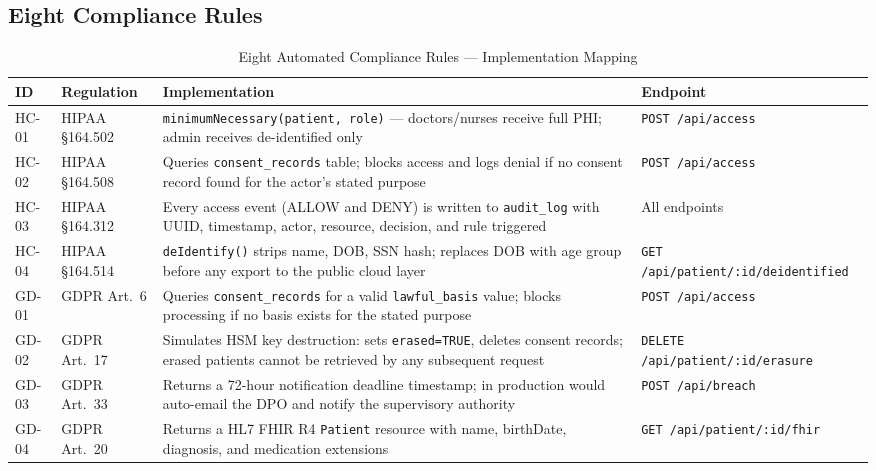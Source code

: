 \documentclass[12pt,a4paper]{article}
\begin{document}
\subsection{Eight Compliance Rules}

\begin{table}[H]
\centering
\caption{Eight Automated Compliance Rules --- Implementation Mapping}
\begin{tabularx}{\textwidth}{@{}llXl@{}}
\toprule
\textbf{ID} & \textbf{Regulation} & \textbf{Implementation} & \textbf{Endpoint} \\
\midrule
HC-01 & HIPAA \S164.502 & \texttt{minimumNecessary(patient, role)} --- doctors/nurses receive full PHI; admin receives de-identified only & \texttt{POST /api/access} \\
\midrule
HC-02 & HIPAA \S164.508 & Queries \texttt{consent\_records} table; blocks access and logs denial if no consent record found for the actor's stated purpose & \texttt{POST /api/access} \\
\midrule
HC-03 & HIPAA \S164.312 & Every access event (ALLOW and DENY) is written to \texttt{audit\_log} with UUID, timestamp, actor, resource, decision, and rule triggered & All endpoints \\
\midrule
HC-04 & HIPAA \S164.514 & \texttt{deIdentify()} strips name, DOB, SSN hash; replaces DOB with age group before any export to the public cloud layer & \texttt{GET /api/patient/:id/deidentified} \\
\midrule
GD-01 & GDPR Art.~6 & Queries \texttt{consent\_records} for a valid \texttt{lawful\_basis} value; blocks processing if no basis exists for the stated purpose & \texttt{POST /api/access} \\
\midrule
GD-02 & GDPR Art.~17 & Simulates HSM key destruction: sets \texttt{erased=TRUE}, deletes consent records; erased patients cannot be retrieved by any subsequent request & \texttt{DELETE /api/patient/:id/erasure} \\
\midrule
GD-03 & GDPR Art.~33 & Returns a 72-hour notification deadline timestamp; in production would auto-email the DPO and notify the supervisory authority & \texttt{POST /api/breach} \\
\midrule
GD-04 & GDPR Art.~20 & Returns a HL7 FHIR R4 \texttt{Patient} resource with name, birthDate, diagnosis, and medication extensions & \texttt{GET /api/patient/:id/fhir} \\
\bottomrule
\end{tabularx}
\end{table}
\end{document}
